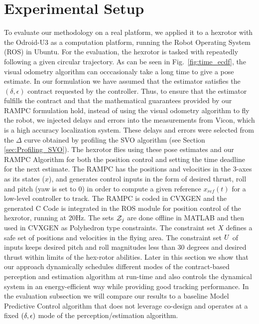 \section{Experimental Setup}

To evaluate our methodology on a real platform, we applied it to a hexrotor with the Odroid-U3 as a computation platform, running the Robot Operating System (ROS) \cite{ROS288} in Ubuntu. For the evaluation, the hexrotor is tasked with repeatedly following a given circular trajectory.
As can be seen in Fig.~\ref{fig:time_ecdf}, the visual odometry algorithm can occcasionaly take a long time to give a pose estimate. In our formulation %
we have assumed that the estimator satisfies the $(\delta, \epsilon)$ contract requested by the controller. Thus, to ensure that the estimator fulfills the contract and that the mathematical guarantees provided by our RAMPC formulation hold, instead of using the visual odometry algorithm to fly the robot, 
we injected delays and errors into the measurements from Vicon, which is a high accuracy localization system. 
These delays and errors were selected from the $\Delta$ curve obtained by profiling the SVO algorithm (see Section \ref{sec:Profiling_SVO}).
The hexrotor flies using these pose estimates and our RAMPC Algorithm for both the position control and setting the time deadline for the next estimate. 
The RAMPC has the positions and velocities in the 3-axes as its states ($x$), and generates control inputs in the form of desired thrust, roll and pitch (yaw is set to 0) in order to compute a given reference $x_{ref}(t)$ for a low-level controller to track. 
The RAMPC is coded in CVXGEN \cite{cvxgen} and the generated C Code is integrated in the ROS module for position control of the hexrotor, running at 20Hz. 
The sets $\mathcal{Z}_j$ are done offline in MATLAB and then used in CVXGEN as Polyhedron type constraints. 
The constraint set $X$ defines a safe set of positions and velocities in the flying area. 
The constraint set $U$ of inputs keeps desired pitch and roll magnitudes less than $30$ degrees and desired thrust within limits of the hex-rotor abilities.
Later in this section we show that our approach dynamically schedules different modes of the contract-based perception and estimation algorithm at run-time and also controls the dynamical system in an energy-efficient way while providing good tracking performance. 
In the evaluation subsection we will compare our results to a baseline Model Predictive Control algorithm that does not leverage co-design and operates at a fixed $(\delta,\epsilon)$ mode of the perception/estimation algorithm.

